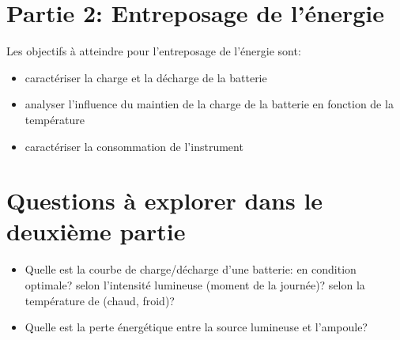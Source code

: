\documentclass[canadien,12pt,oneside,letterpaper]{article}
\begin{document}
\section{Partie 2: Entreposage de l'énergie}\label{sec:partie2}
\vspace{-2ex}
Les objectifs à atteindre pour l'entreposage de l'énergie sont:
\begin{itemize}
\item caractériser la charge et la décharge de la batterie
\item analyser l'influence du maintien de la charge de la batterie en fonction de la température
\item caractériser la consommation de l'instrument
\end{itemize}

\section{Questions à explorer dans le deuxième partie}
\begin{itemize}
\item Quelle est la courbe de charge/décharge d'une batterie: en condition optimale? selon l'intensité lumineuse (moment de la journée)? selon la température de (chaud, froid)?
\item Quelle est la perte énergétique entre la source lumineuse et l'ampoule? 
\end{itemize}
\end{document}
